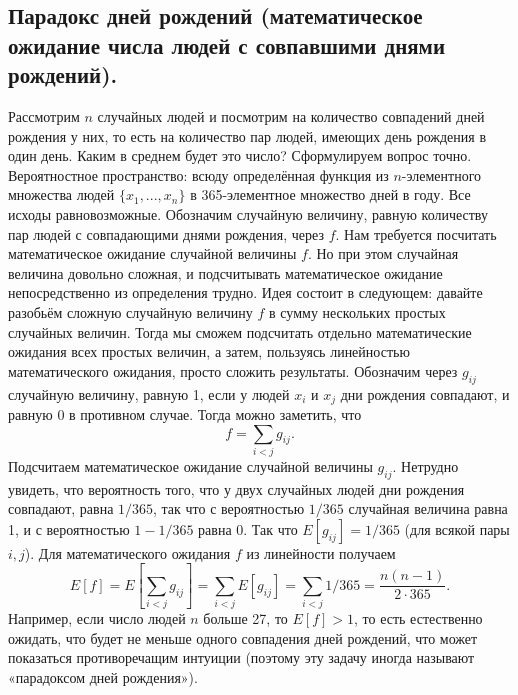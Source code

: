 \documentclass{article}
\begin{document}
\subsection{Парадокс дней рождений (математическое ожидание числа людей с совпавшими днями рождений).}
Рассмотрим $n$ случайных людей и посмотрим на количество совпадений дней рождения у них, то есть на количество пар людей, имеющих день рождения в один день. Каким в среднем будет это число?
\newline
Сформулируем вопрос точно. Вероятностное пространство: всюду определённая функция из $n$-элементного множества людей $\{x_1, ..., x_n\}$ в 365-элементное множество дней в году. Все исходы равновозможные.
\newline
Обозначим случайную величину, равную количеству пар людей с совпадающими днями рождения, через $f$. Нам требуется посчитать математическое ожидание случайной величины $f$. Но при этом случайная величина довольно сложная, и подсчитывать математическое ожидание непосредственно из определения трудно.
\newline
Идея состоит в следующем: давайте разобьём сложную случайную величину $f$ в сумму нескольких простых случайных величин. Тогда мы сможем подсчитать отдельно математические ожидания всех простых величин, а затем, пользуясь линейностью математического ожидания, просто сложить результаты.
\newline
Обозначим через $g_{ij}$ случайную величину, равную 1, если у людей $x_i$ и $x_j$ дни рождения совпадают, и равную 0 в противном случае. Тогда можно заметить, что
\[
f = \sum_{i < j} g_{ij}.
\]
Подсчитаем математическое ожидание случайной величины $g_{ij}$. Нетрудно увидеть, что вероятность того, что у двух случайных людей дни рождения совпадают, равна $1/365$, так что с вероятностью $1/365$ случайная величина равна 1, и с вероятностью $1-1/365$ равна 0. Так что $E[g_{ij}] = 1/365$ (для всякой пары $i,j$). Для математического ожидания $f$ из линейности получаем
\[
E[f] = E[\sum_{i<j} g_{ij}] = \sum_{i<j} E[g_{ij}] = 
\sum_{i<j} 1/365 = \frac{n(n-1)}{2 \cdot 365}.
\]
Например, если число людей $n$ больше 27, то $E[f] > 1$, то есть естественно ожидать, что будет не меньше одного совпадения дней рождений, что может показаться противоречащим интуиции (поэтому эту задачу иногда называют «парадоксом дней рождения»).
\end{document}
